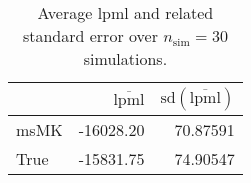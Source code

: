 \begin{table}[H]

\caption{Average lpml and related standard error over $n_{\text{sim}} = 30$ simulations.}
\centering
\begin{tabular}[t]{lrr}
\toprule
  & $\overbar{\text{lpml}}$ & $\text{sd}(\overbar{\text{lpml}})$\\
\midrule
msMK & -16028.20 & 70.87591\\
True & -15831.75 & 74.90547\\
\bottomrule
\end{tabular}
\end{table}